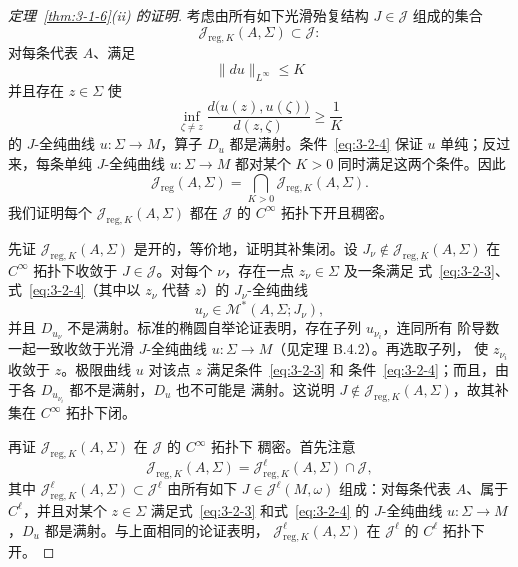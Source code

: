 \begin{proof}[定理~\ref{thm:3-1-6}\textup{(ii)} 的证明]
考虑由所有如下光滑殆复结构 $J\in\mathcal J$ 组成的集合
\[
  \mathcal J_{\mathrm{reg},K}(A,\Sigma)\subset\mathcal J:
\]
对每条代表 $A$、满足
\begin{equation}\label{eq:3-2-3}
  \|du\|_{L^\infty}\le K
\end{equation}
并且存在 $z\in\Sigma$ 使
\begin{equation}\label{eq:3-2-4}
  \inf_{\zeta\ne z}
  \frac{d\bigl(u(z),u(\zeta)\bigr)}{d(z,\zeta)}
  \ge\frac1K
\end{equation}
的 $J$-全纯曲线 $u:\Sigma\to M$，算子 $D_u$ 都是满射。条件~\eqref{eq:3-2-4}
保证 $u$ 单纯；反过来，每条单纯 $J$-全纯曲线 $u:\Sigma\to M$ 都对某个 $K>0$
同时满足这两个条件。因此
\[
  \mathcal J_{\mathrm{reg}}(A,\Sigma)
  =\bigcap_{K>0}\mathcal J_{\mathrm{reg},K}(A,\Sigma).
\]
我们证明每个 $\mathcal J_{\mathrm{reg},K}(A,\Sigma)$ 都在 $\mathcal J$ 的
$C^\infty$ 拓扑下开且稠密。

先证 $\mathcal J_{\mathrm{reg},K}(A,\Sigma)$ 是开的，等价地，证明其补集闭。设
$J_\nu\notin\mathcal J_{\mathrm{reg},K}(A,\Sigma)$ 在 $C^\infty$ 拓扑下收敛于
$J\in\mathcal J$。对每个 $\nu$，存在一点 $z_\nu\in\Sigma$ 及一条满足
式~\eqref{eq:3-2-3}、式~\eqref{eq:3-2-4}（其中以 $z_\nu$ 代替 $z$）的
$J_\nu$-全纯曲线
\[
  u_\nu\in\mathcal M^*(A,\Sigma;J_\nu),
\]
并且 $D_{u_\nu}$ 不是满射。标准的椭圆自举论证表明，存在子列 $u_{\nu_i}$，连同所有
阶导数一起一致收敛于光滑 $J$-全纯曲线 $u:\Sigma\to M$（见定理 B.4.2）。再选取子列，
使 $z_{\nu_i}$ 收敛于 $z$。极限曲线 $u$ 对该点 $z$ 满足条件~\eqref{eq:3-2-3} 和
条件~\eqref{eq:3-2-4}；而且，由于各 $D_{u_{\nu_i}}$ 都不是满射，$D_u$ 也不可能是
满射。这说明 $J\notin\mathcal J_{\mathrm{reg},K}(A,\Sigma)$，故其补集在
$C^\infty$ 拓扑下闭。

再证 $\mathcal J_{\mathrm{reg},K}(A,\Sigma)$ 在 $\mathcal J$ 的 $C^\infty$ 拓扑下
稠密。首先注意
\[
  \mathcal J_{\mathrm{reg},K}(A,\Sigma)
  =\mathcal J_{\mathrm{reg},K}^\ell(A,\Sigma)\cap\mathcal J,
\]
其中 $\mathcal J_{\mathrm{reg},K}^\ell(A,\Sigma)\subset\mathcal J^\ell$ 由所有如下
$J\in\mathcal J^\ell(M,\omega)$ 组成：对每条代表 $A$、属于 $C^\ell$，并且对某个
$z\in\Sigma$ 满足式~\eqref{eq:3-2-3} 和式~\eqref{eq:3-2-4} 的 $J$-全纯曲线
$u:\Sigma\to M$，$D_u$ 都是满射。与上面相同的论证表明，
$\mathcal J_{\mathrm{reg},K}^\ell(A,\Sigma)$ 在 $\mathcal J^\ell$ 的 $C^\ell$ 拓扑下开。


\end{proof}
